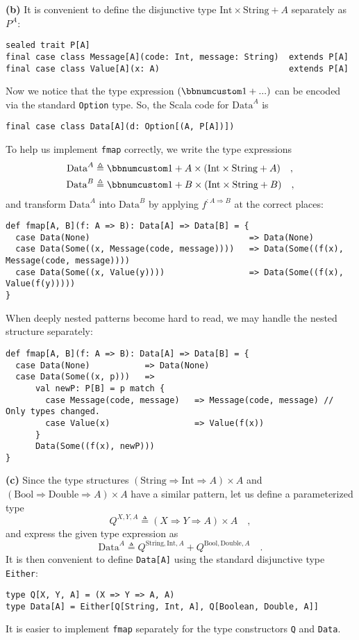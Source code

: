 \textbf{(b)} It is convenient to define the disjunctive type $\text{Int}\times\text{String}+A$
separately as $P^{A}$:
\begin{lstlisting}
sealed trait P[A]
final case class Message[A](code: Int, message: String)  extends P[A]
final case class Value[A](x: A)                          extends P[A]
\end{lstlisting}
Now we notice that the type expression $\left(\bbnum 1+...\right)$
can be encoded via the standard \lstinline!Option! type. So, the
Scala code for $\text{Data}^{A}$ is
\begin{lstlisting}
final case class Data[A](d: Option[(A, P[A])])
\end{lstlisting}
To help us implement \lstinline!fmap! correctly, we write the type
expressions 
\begin{align*}
\text{Data}^{A} & \triangleq\bbnum 1+A\times(\text{Int}\times\text{String}+A)\quad,\\
\text{Data}^{B} & \triangleq\bbnum 1+B\times(\text{Int}\times\text{String}+B)\quad,
\end{align*}
and transform $\text{Data}^{A}$ into $\text{Data}^{B}$ by applying
$f^{:A\Rightarrow B}$ at the correct places:
\begin{lstlisting}
def fmap[A, B](f: A => B): Data[A] => Data[B] = {
  case Data(None)                                => Data(None)
  case Data(Some((x, Message(code, message))))   => Data(Some((f(x), Message(code, message))))
  case Data(Some((x, Value(y))))                 => Data(Some((f(x), Value(f(y)))))
}
\end{lstlisting}
When deeply nested patterns become hard to read, we may handle the
nested structure separately:
\begin{lstlisting}
def fmap[A, B](f: A => B): Data[A] => Data[B] = {
  case Data(None)           => Data(None)
  case Data(Some((x, p)))   =>
      val newP: P[B] = p match {
        case Message(code, message)   => Message(code, message) // Only types changed.
        case Value(x)                 => Value(f(x))
      }
      Data(Some((f(x), newP)))
}
\end{lstlisting}

\textbf{(c)} Since the type structures $(\text{String}\Rightarrow\text{Int}\Rightarrow A)\times A$
and $(\text{Bool}\Rightarrow\text{Double}\Rightarrow A)\times A$
have a similar pattern, let us define a parameterized type
\[
Q^{X,Y,A}\triangleq\left(X\Rightarrow Y\Rightarrow A\right)\times A\quad,
\]
and express the given type expression as 
\[
\text{Data}^{A}\triangleq Q^{\text{String},\text{Int},A}+Q^{\text{Bool},\text{Double},A}\quad.
\]
It is then convenient to define \lstinline!Data[A]! using the standard
disjunctive type \lstinline!Either!: 
\begin{lstlisting}
type Q[X, Y, A] = (X => Y => A, A)
type Data[A] = Either[Q[String, Int, A], Q[Boolean, Double, A]]
\end{lstlisting}
It is easier to implement \lstinline!fmap! separately for the type
constructors \lstinline!Q! and \lstinline!Data!.

